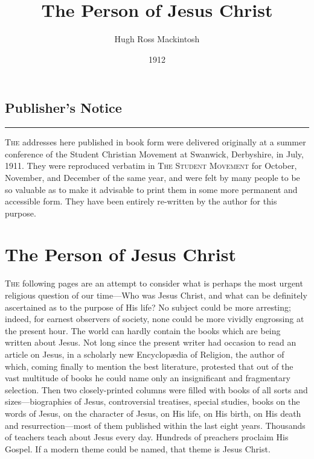\documentclass[12pt,a5paper,oneside]{book}
\title{The Person of Jesus Christ}
\author{Hugh Ross Mackintosh}
\date{1912}
\begin{document}
\frontmatter

\maketitle

\tableofcontents


\section*{Publisher's Notice}

\begin{center}
\noindent\rule{4cm}{0.4pt}
\end{center}

\textsc{The} addresses here published in book form were
delivered originally at a summer conference of
the Student Christian Movement at Swanwick,
Derbyshire, in July, 1911. They were reproduced 
verbatim in \textsc{The Student Movement} for October,
November, and December of the same year, and
were felt by many people to be so valuable as to
make it advisable to print them in some more
permanent and accessible form. They have been
entirely re-written by the author for this purpose.

\chapter*{The Person of Jesus Christ}
\textsc{The} following pages are an attempt to
consider what is perhaps the most urgent 
religious question of our time---Who
was Jesus Christ, and what can be definitely
ascertained as to the purpose of His life? 
No subject could be more arresting; indeed,
for earnest observers of society, none could 
be more vividly engrossing at the present
hour. The world can hardly contain the 
books which are being written about Jesus. 
Not long since the present writer had occasion to read an article on Jesus, in a 
scholarly new Encyclop{\ae}dia of Religion, the 
author of which, coming finally to mention
the best literature, protested that out of the
vast multitude of books he could name only
an insignificant and fragmentary selection.
Then two closely-printed columns were filled
with books of all sorts and sizes---biographies
of Jesus, controversial treatises, special studies,
books on the words of Jesus, on the character 
of Jesus, on His life, on His birth, on His death
and resurrection---most of them published 
within the last eight years. Thousands of
teachers teach about Jesus every day. Hundreds 
of preachers proclaim His Gospel. If a modern
theme could be named, that theme is Jesus 
Christ.
\end{document}
